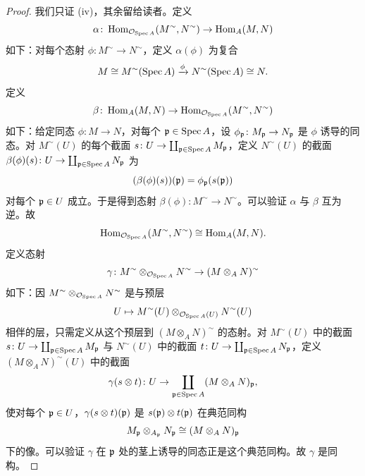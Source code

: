 \begin{proof}
我们只证 (iv)，其余留给读者。定义
\[
\alpha\colon\operatorname{Hom}_{\mathcal{O}_{\operatorname{Spec} A}}(M^\sim,N^\sim)\to\operatorname{Hom}_A(M,N)
\]
如下：对每个态射 $\phi\colon M^\sim\to N^\sim$，定义 $\alpha(\phi)$ 为复合
\[
M\cong M^\sim(\operatorname{Spec} A)\xrightarrow{\phi}N^\sim(\operatorname{Spec} A)\cong N.
\]
定义
\[
\beta\colon\operatorname{Hom}_A(M,N)\to\operatorname{Hom}_{\mathcal{O}_{\operatorname{Spec} A}}(M^\sim,N^\sim)
\]
如下：给定同态 $\phi\colon M\to N$，对每个 $\mathfrak{p}\in\operatorname{Spec} A$，设 $\phi_{\mathfrak{p}}\colon M_{\mathfrak{p}}\to N_{\mathfrak{p}}$ 是 $\phi$ 诱导的同态。对 $M^\sim(U)$ 的每个截面 $s\colon U\to\coprod_{\mathfrak{p}\in\operatorname{Spec} A}M_{\mathfrak{p}}$，定义 $N^\sim(U)$ 的截面 $\beta(\phi)(s)\colon U\to\coprod_{\mathfrak{p}\in\operatorname{Spec} A}N_{\mathfrak{p}}$ 为
\[
(\beta(\phi)(s))(\mathfrak{p})=\phi_{\mathfrak{p}}(s(\mathfrak{p}))
\]
对每个 $\mathfrak{p}\in U$ 成立。于是得到态射 $\beta(\phi)\colon M^\sim\to N^\sim$。可以验证 $\alpha$ 与 $\beta$ 互为逆。故
\[
\operatorname{Hom}_{\mathcal{O}_{\operatorname{Spec} A}}(M^\sim,N^\sim)\cong\operatorname{Hom}_A(M,N).
\]
定义态射
\[
\gamma\colon M^\sim\otimes_{\mathcal{O}_{\operatorname{Spec} A}}N^\sim\to(M\otimes_A N)^\sim
\]
如下：因 $M^\sim\otimes_{\mathcal{O}_{\operatorname{Spec} A}}N^\sim$ 是与预层
\[
U\mapsto M^\sim(U)\otimes_{\mathcal{O}_{\operatorname{Spec} A}(U)}N^\sim(U)
\]
相伴的层，只需定义从这个预层到 $(M\otimes_A N)^\sim$ 的态射。对 $M^\sim(U)$ 中的截面 $s\colon U\to\coprod_{\mathfrak{p}\in\operatorname{Spec} A}M_{\mathfrak{p}}$ 与 $N^\sim(U)$ 中的截面 $t\colon U\to\coprod_{\mathfrak{p}\in\operatorname{Spec} A}N_{\mathfrak{p}}$，定义 $(M\otimes_A N)^\sim(U)$ 中的截面
\[
\gamma(s\otimes t)\colon U\to\coprod_{\mathfrak{p}\in\operatorname{Spec} A}(M\otimes_A N)_{\mathfrak{p}},
\]
使对每个 $\mathfrak{p}\in U$，$\gamma(s\otimes t)(\mathfrak{p})$ 是 $s(\mathfrak{p})\otimes t(\mathfrak{p})$ 在典范同构
\[
M_{\mathfrak{p}}\otimes_{A_{\mathfrak{p}}}N_{\mathfrak{p}}\cong(M\otimes_A N)_{\mathfrak{p}}
\]
下的像。可以验证 $\gamma$ 在 $\mathfrak{p}$ 处的茎上诱导的同态正是这个典范同构。故 $\gamma$ 是同构。


\end{proof}
